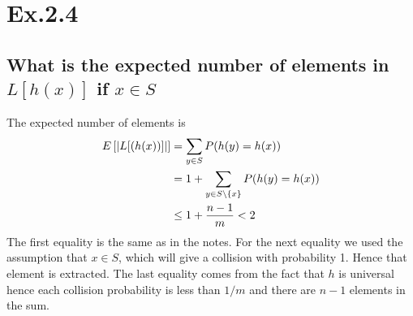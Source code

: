 \section*{Ex.2.4}
\subsection*{What is the expected number of elements in $L[h(x)]$ if $x \in S$}

The expected number of elements is
\begin{align*}
E\left[ \abs*{L[(h(x))]} \right] 
       &= \sum_{y\in S} P(h(y) = h(x)) \\
       &= 1 + \sum_{y\in S\backslash\{x\}} P(h(y) = h(x)) \\
       &\leq 1 + \frac{n-1}{m} < 2
\end{align*}
The first equality is the same as in the notes. For the next equality we used the assumption that $x\in S$, which will give a collision with probability 1. Hence that element is extracted. The last equality comes from the fact that $h$ is universal hence each collision probability is less than $1/m$ and there are $n-1$ elements in the sum.
